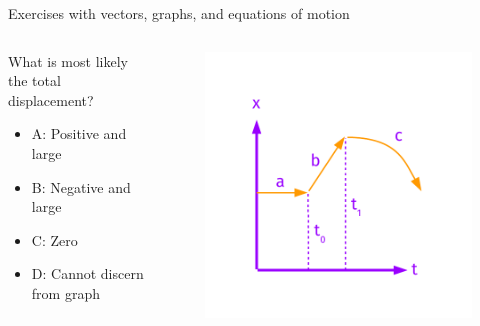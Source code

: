 \documentclass{beamer}
\begin{document}
\begin{frame}{Exercises with vectors, graphs, and equations of motion}
\begin{columns}[T]
\begin{column}{0.4\textwidth}
\small
What is most likely the total displacement?
\begin{itemize}
\item A: Positive and large
\item B: Negative and large
\item C: Zero
\item D: Cannot discern from graph
\end{itemize}
\end{column}
\begin{column}{0.6\textwidth}
\begin{figure}
\centering
\includegraphics[width=\textwidth,trim=0cm 0cm 0cm 1.5cm,clip=true]{figures/FurtherExercises.pdf}
\end{figure}
\end{column}
\end{columns}
\end{frame}
\end{document}
